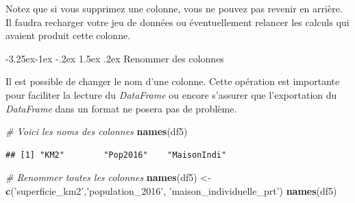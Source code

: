 \documentclass[
  11pt,
  french,
]{book}
\makeatletter
\newenvironment{Shaded}{\begin{snugshade}}{\end{snugshade}}
\newcommand{\CommentTok}[1]{\textcolor[rgb]{0.56,0.35,0.01}{\textit{#1}}}
\newcommand{\DecValTok}[1]{\textcolor[rgb]{0.00,0.00,0.81}{#1}}
\newcommand{\KeywordTok}[1]{\textcolor[rgb]{0.13,0.29,0.53}{\textbf{#1}}}
\newcommand{\NormalTok}[1]{#1}
\newcommand{\OperatorTok}[1]{\textcolor[rgb]{0.81,0.36,0.00}{\textbf{#1}}}
\newcommand{\OtherTok}[1]{\textcolor[rgb]{0.56,0.35,0.01}{#1}}
\newcommand{\StringTok}[1]{\textcolor[rgb]{0.31,0.60,0.02}{#1}}
\newenvironment{kframe}{%
\medskip{}
\setlength{\fboxsep}{.8em}
 \def\at@end@of@kframe{}%
 \ifinner\ifhmode%
  \def\at@end@of@kframe{\end{minipage}}%
  \begin{minipage}{\columnwidth}%
 \fi\fi%
 \def\FrameCommand##1{\hskip\@totalleftmargin \hskip-\fboxsep
 \colorbox{shadecolor}{##1}\hskip-\fboxsep
     \hskip-\linewidth \hskip-\@totalleftmargin \hskip\columnwidth}%
 \MakeFramed {\advance\hsize-\width
   \@totalleftmargin\z@ \linewidth\hsize
   \@setminipage}}%
 {\par\unskip\endMakeFramed%
 \at@end@of@kframe}
\renewenvironment{Shaded}{\begin{kframe}}{\end{kframe}}
\renewcommand\paragraph{\@startsection{paragraph}{4}{\z@}%
   {-3.25ex\@plus -1ex \@minus -.2ex}%
   {1.5ex \@plus .2ex}%
   {\normalfont\normalsize\bfseries}}
\makeatother
\begin{document}
\begin{Shaded}
\end{Shaded}

Notez que si vous supprimez une colonne, vous ne pouvez pas revenir en arrière. Il faudra recharger votre jeu de données ou éventuellement relancer les calculs qui avaient produit cette colonne.

\hypertarget{sect014224}{%
\paragraph{Renommer des colonnes}\label{sect014224}}

Il est possible de changer le nom d'une colonne. Cette opération est importante pour faciliter la lecture du \emph{DataFrame} ou encore s'assurer que l'exportation du \emph{DataFrame} dans un format ne posera pas de problème.

\begin{Shaded}
\begin{Highlighting}[]
\CommentTok{# Voici les noms des colonnes}
\KeywordTok{names}\NormalTok{(df5)}
\end{Highlighting}
\end{Shaded}

\begin{verbatim}
## [1] "KM2"        "Pop2016"    "MaisonIndi"
\end{verbatim}

\begin{Shaded}
\begin{Highlighting}[]
\CommentTok{# Renommer toutes les colonnes}
\KeywordTok{names}\NormalTok{(df5) <-}\StringTok{ }\KeywordTok{c}\NormalTok{(}\StringTok{'superficie_km2'}\NormalTok{,}\StringTok{'population_2016'}\NormalTok{, }\StringTok{'maison_individuelle_prt'}\NormalTok{)}
\KeywordTok{names}\NormalTok{(df5)}
\end{Highlighting}
\end{Shaded}
\end{document}

